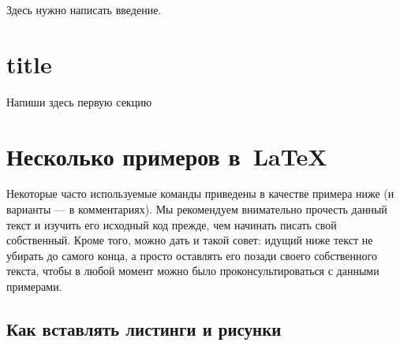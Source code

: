 



\usepackage{csquotes}        %
\usepackage[
]{biblatex}





\Intro

Здесь нужно написать введение.


\section{title}

Напиши здесь первую секцию
\section{Несколько примеров в~\LaTeX{}}
\label{sec:examples}

Некоторые часто используемые
команды приведены в качестве примера ниже (и варианты — в
комментариях). Мы рекомендуем внимательно прочесть данный
текст и изучить его исходный код прежде, чем начинать писать
свой собственный. Кроме того, можно дать и такой совет: идущий
ниже текст не убирать до самого конца, а просто оставлять его
позади своего собственного текста, чтобы в любой момент можно
было проконсультироваться с данными примерами.

\subsection{Как вставлять листинги и рисунки}

